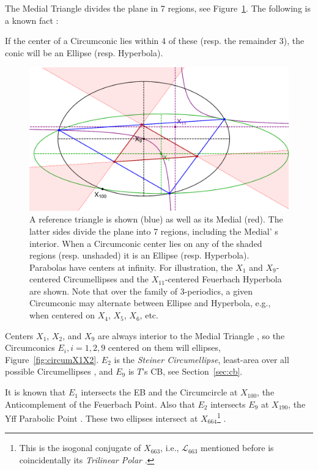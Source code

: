 The Medial Triangle divides the plane in 7 regions, see  Figure~\ref{fig:midlines}. The following is a known fact  \cite{akopyan2007-conics,odehnal2015-conics}:

\begin{remark}
If the center of a Circumconic lies within 4 of these (resp. the remainder 3), the conic will be an Ellipse (resp. Hyperbola).
\end{remark}

\begin{figure}
    \centering
    \includegraphics[width=\textwidth]{pics_eps_new/0070_medial_midlines_cropped.eps}
    \caption{A reference triangle is shown (blue) as well as its Medial (red). The latter sides divide the plane into 7 regions, including the Medial' s interior. When a Circumconic center lies on any of the shaded regions (resp. unshaded) it is an Ellipse (resp. Hyperbola). Parabolas have centers at infinity. For illustration, the $X_1$ and $X_9$-centered Circumellipses and the $X_{11}$-centered Feuerbach Hyperbola are shown. Note that over the family of 3-periodics, a given Circumconic may alternate between Ellipse and Hyperbola, e.g., when centered on $X_4$, $X_5$, $X_6$, etc.}
    \label{fig:midlines}
\end{figure}

Centers $X_1$, $X_2$, and $X_9$ are always interior to the Medial Triangle \cite{etc}, so the Circumconics $E_i,i=1,2,9$ centered on them will ellipses, Figure~\ref{fig:circumX1X2}. $E_2$ is the {\em Steiner Circumellipse}, least-area over all possible Circumellipses \cite{mw}, and $E_9$ is $T$'s CB, see Section~\ref{sec:cb}.

It is known that $E_1$ intersects the EB and the Circumcircle at $X_{100}$, the Anticomplement of the Feuerbach Point. Also that $E_2$ intersects $E_9$ at $X_{190}$, the Yff Parabolic Point \cite{dekov14,etc}. These two ellipses intersect at $X_{664}$\footnote{This is the isogonal conjugate of $X_{663}$, i.e., $\mathcal{L}_{663}$ mentioned before is coincidentally its {\em Trilinear Polar} \cite{mw}.} \cite{moses2020-private-circumconic}.

